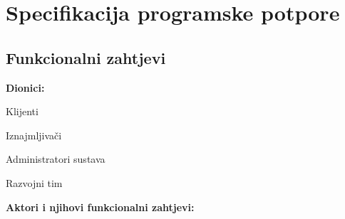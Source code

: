 \chapter{Specifikacija programske potpore}
		
	\section{Funkcionalni zahtjevi}
			
			
			
			\noindent \textbf{Dionici:}
			
			\begin{packed_enum}
				
				\item Klijenti
				\item Iznajmljivači			
				\item Administratori sustava
				\item Razvojni tim 
				
			\end{packed_enum}
			
			\noindent \textbf{Aktori i njihovi funkcionalni zahtjevi:}
			
